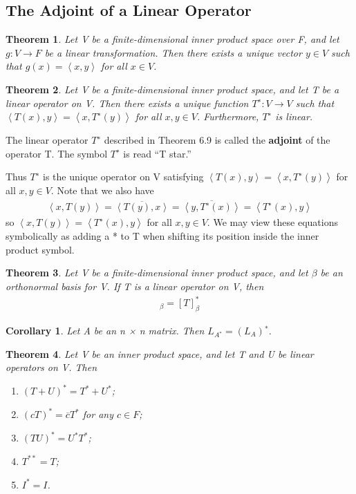 \documentclass{article}
\newcommand{\bd}[1]{\textbf{#1}}
\newcommand{\ip}[1]{\left\langle {#1}\right\rangle} %
\newcommand{\enumalph}[0]{\begin{enumerate}[label=(\alph*)]}
\theoremstyle{plain}
\newtheorem{theorem}{Theorem}[section]
\newtheorem*{corollary}{Corollary}
\theoremstyle{plain} %
\begin{document}
\subsection{The Adjoint of a Linear Operator}

\begin{theorem}
  Let V be a finite-dimensional inner product space over F, and let $g: V \to F$ be a linear transformation. Then there exists a unique vector $y \in V$ such that $g(x) = \ip{x, y}$ for all $x \in V$.
\end{theorem}

\begin{theorem}
  Let V be a finite-dimensional inner product space, and let T be a linear operator on V. Then there exists a unique function $T^∗ : V \to V$ such that $\ip{T(x), y} = \ip{x,T^∗(y)}$ for all $x, y \in V$. Furthermore, $T^∗$ is linear.
\end{theorem}

The linear operator $T^∗$ described in Theorem 6.9 is called the \bd{adjoint} of the operator T. The symbol $T^∗$ is read “T star.”

Thus $T^∗$ is the unique operator on V satisfying $\ip{T(x), y} = \ip{x,T^∗(y)}$ for all $x, y \in V$. Note that we also have
\begin{align*}
  \ip{x,T(y)} = \overline{\ip{T(y), x}} = \overline{\ip{y,T^∗(x)}} = \ip{T^∗(x), y}
\end{align*}
so $\ip{x,T(y)} = \ip{T^∗(x), y}$ for all $x, y \in V$. We may view these equations symbolically as adding a * to T when shifting its position inside the inner product symbol.

\begin{theorem}
  Let V be a finite-dimensional inner product space, and let $\beta$ be an orthonormal basis for V. If T is a linear operator on V, then
  \begin{align*}
    [T^*]_\beta=[T]^*_\beta
  \end{align*}
\end{theorem}

\begin{corollary}
  Let A be an n × n matrix. Then $L_{A^∗} = (L_A)^∗$.
\end{corollary}

\begin{theorem}
  Let V be an inner product space, and let T and U be linear operators on V. Then
  \enumalph
    \item $(T+U)^*=T^*+U^*$;
    \item $(cT)^*=\overline{c}T^*$ for any $c\in F$;
    \item $(TU)^*=U^*T^*$;
    \item $T^{**}=T$;
    \item $I^*=I$.
  \end{enumerate}
\end{theorem}
\end{document}
